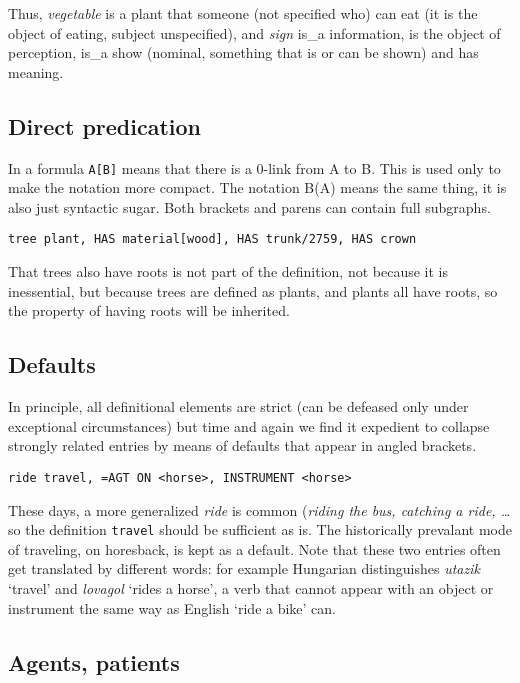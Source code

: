 \documentclass[11pt,bookmarks,bookmarksnumbered,naturalnames,plainpages=false,pdftex,colorlinks=true,urlcolor=blue,bookmarksdepth=subsection,plainpages=false]{paper}
\begin{document}
\noindent
Thus, {\it vegetable} is a plant that someone (not specified who) can eat (it
is the object of eating, subject unspecified), and {\it sign} is\_a
information, is the object of perception, is\_a show (nominal, something that
is or can be shown) and has meaning.

\subsection{Direct predication}\label{isa}

In a formula {\tt A[B]} means that there is a 0-link from A to B. This is used
only to make the notation more compact. The notation B(A) means the same
thing, it is also just syntactic sugar. Both brackets and parens can contain
full subgraphs. 

\begin{verbatim}
tree plant, HAS material[wood], HAS trunk/2759, HAS crown 
\end{verbatim}

\noindent
That trees also have roots is not part of the definition, not because it is
inessential, but because trees are defined as plants, and plants all have
roots, so the property of having roots will be inherited.

\subsection{Defaults}\label{default}

In principle, all definitional elements are strict (can be defeased only under
exceptional circumstances) but time and again we find it expedient to collapse 
strongly related entries by means of defaults that appear in angled brackets. 

\begin{verbatim}
ride travel, =AGT ON <horse>, INSTRUMENT <horse>
\end{verbatim}

\noindent
These days, a more generalized {\it ride} is common ({\it riding the bus,
  catching a ride, \ldots} so the definition {\tt travel} should be sufficient
as is. The historically prevalant mode of traveling, on horesback, is kept as
a default. Note that these two entries often get translated by different
words: for example Hungarian distinguishes {\it utazik} `travel' and {\it
  lovagol} `rides a horse', a verb that cannot appear with an object or
instrument the same way as English `ride a bike' can.  

\subsection{Agents, patients}\label{agtpat}
\end{document}
